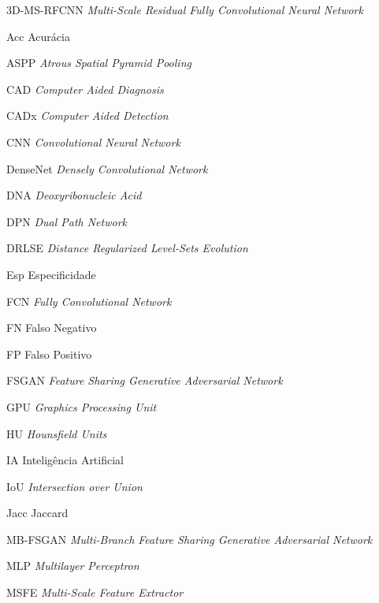\documentclass[
	12pt,				%
	oneside,			%
	a4paper,			%
	english,			%
	french,				%
	spanish,			%
	brazil				%
	]{abntex2}
\begin{document}
\cleardoublepage


\listoffigures*
\cleardoublepage

\listoftables*
\cleardoublepage

\begin{siglas}

    \item[3D-MS-RFCNN] \textit{Multi-Scale Residual Fully Convolutional Neural Network}
    \item[Acc] Acurácia
    \item[ASPP] \textit{Atrous Spatial Pyramid Pooling}
    \item[CAD] \textit{Computer Aided Diagnosis}
    \item[CADx] \textit{Computer Aided Detection}
    \item[CNN] \textit{Convolutional Neural Network}
    \item[DenseNet] \textit{Densely Convolutional Network}
    \item[DNA] \textit{Deoxyribonucleic Acid}
    \item[DPN] \textit{Dual Path Network}
    \item[DRLSE] \textit{Distance Regularized Level-Sets Evolution}
    \item[Esp] Especificidade
    \item[FCN] \textit{Fully Convolutional Network}
    \item[FN] Falso Negativo
    \item[FP] Falso Positivo
    \item[FSGAN] \textit{Feature Sharing Generative Adversarial Network}
    \item[GPU] \textit{Graphics Processing Unit}
    \item[HU] \textit{Hounsfield Units}
    \item[IA] Inteligência Artificial
    \item[IoU] \textit{Intersection over Union}
    \item[Jacc] Jaccard
    \item[MB-FSGAN] \textit{Multi-Branch Feature Sharing Generative Adversarial Network}
    \item[MLP] \textit{Multilayer Perceptron}
    \item[MSFE] \textit{Multi-Scale Feature Extractor}
    

\end{siglas}
\end{document}
